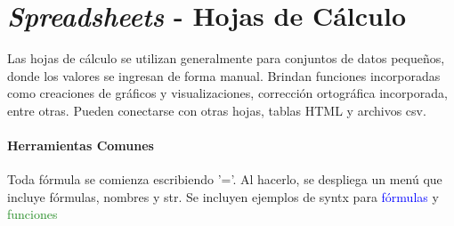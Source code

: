 
\section{\textit{Spreadsheets} - Hojas de Cálculo}
Las hojas de cálculo se utilizan generalmente para conjuntos de datos pequeños, donde los valores se ingresan de forma manual. Brindan funciones incorporadas como creaciones de gráficos y visualizaciones, corrección ortográfica incorporada, entre otras. Pueden conectarse con otras hojas, tablas HTML y archivos \gls{csv}.

\paragraph{Herramientas Comunes}
Toda fórmula se comienza escribiendo '='. Al hacerlo, se despliega un menú que incluye fórmulas, nombres y \gls{str}. Se incluyen ejemplos de \gls{syntx} para \textcolor{blue}{fórmulas} y \textcolor{ForestGreen}{funciones}

